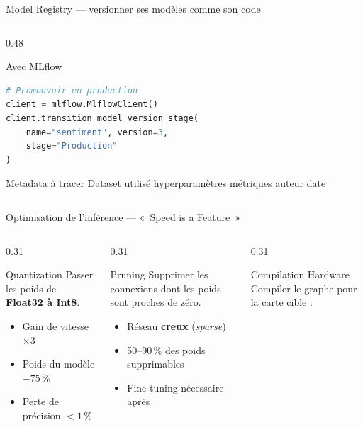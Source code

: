 \documentclass[aspectratio=169, 10pt]{beamer}
\begin{document}
\begin{frame}[fragile]{Model Registry --- versionner ses modèles comme son code}
\begin{columns}[T]
\begin{column}{0.48\textwidth}
\begin{exampleblock}{Avec MLflow}
\begin{lstlisting}[language=Python, basicstyle=\ttfamily\scriptsize, numbers=none]
# Promouvoir en production
client = mlflow.MlflowClient()
client.transition_model_version_stage(
    name="sentiment", version=3,
    stage="Production"
)
\end{lstlisting}
      \end{exampleblock}
      \begin{block}{Metadata à tracer}
        Dataset utilisé \textbullet{} hyperparamètres
        \textbullet{} métriques \textbullet{} auteur \textbullet{} date
      \end{block}
    \end{column}
  \end{columns}
\end{frame}

\begin{frame}{Optimisation de l'inférence --- «~Speed is a Feature~»}
  \begin{columns}[T]
    \begin{column}{0.31\textwidth}
      \begin{block}{Quantization}
        Passer les poids de \textbf{Float32 à Int8}.
        \begin{itemize}
          \item Gain de vitesse $\times 3$
          \item Poids du modèle $-75\,\%$
          \item Perte de précision $< 1\,\%$
        \end{itemize}
      \end{block}
    \end{column}
    \begin{column}{0.31\textwidth}
      \begin{block}{Pruning}
        Supprimer les connexions dont les poids
        sont proches de zéro.
        \begin{itemize}
          \item Réseau \textbf{creux} (\textit{sparse})
          \item 50--90\,\% des poids supprimables
          \item Fine-tuning nécessaire après
        \end{itemize}
      \end{block}
    \end{column}
    \begin{column}{0.31\textwidth}
      \begin{block}{Compilation Hardware}
        Compiler le graphe pour la carte cible :
        \begin{itemize}

\end{itemize}
\end{block}
\end{column}
\end{columns}
\end{frame}
\end{document}
